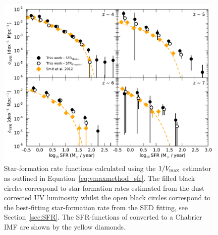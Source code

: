 \begin{figure}
\centering
\includegraphics[width=140mm]{plots/fig14.pdf}
\caption[Short caption]{Star-formation rate functions calculated using the $1/V_{\rm{max}}$ estimator as outlined in Equation~\ref{eq:vmaxmethod_sfr}. The filled black circles correspond to star-formation rates estimated from the dust corrected UV luminosity whilst the open black circles correspond to the best-fitting star-formation rate from the SED fitting, see Section~\ref{sec:SFR}. The SFR-functions of \citet{Smit:2012is} converted to a Chabrier IMF are shown by the yellow diamonds.}
\label{fig:sfr_function}
\end{figure}

